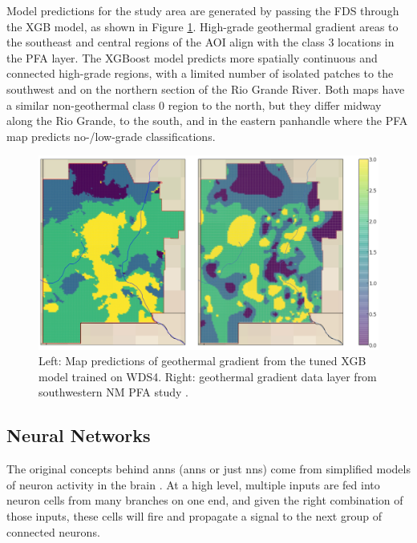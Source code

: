 Model predictions for the study area are generated by passing the FDS through the XGB model, as shown in Figure \ref{fig:xgb_final_map}. High-grade geothermal gradient areas to the southeast and central regions of the AOI align with the class 3 locations in the \citet{bielicki_hydrogeolgic_2015} PFA layer. The XGBoost model predicts more spatially continuous and connected high-grade regions, with a limited number of isolated patches to the southwest and on the northern section of the Rio Grande River. Both maps have a similar non-geothermal class 0 region to the north, but they differ midway along the Rio Grande, to the south, and in the eastern panhandle where the PFA map predicts no-/low-grade classifications.

\begin{figure}[!htp]
\centering
\includegraphics[width=\textwidth]{templates/images/Figure-XGB-FinalMap_Joint.png}
\caption[XGBoost prediction map]{Left: Map predictions of geothermal gradient from the tuned XGB model trained on WDS4. Right: geothermal gradient data layer from southwestern NM PFA study \protect\citep{bielicki_hydrogeolgic_2015}.}
\label{fig:xgb_final_map}
\end{figure}

\subsection{Neural Networks} \label{ch5:ann}
The original concepts behind \acrlong{ann}s (\acrshort{ann}s or just \acrshort{nn}s) come from simplified models of neuron activity in the brain \citep[p.\ 394]{hastie_elements_2009}. At a high level, multiple inputs are fed into neuron cells from many branches on one end, and given the right combination of those inputs, these cells will fire and propagate a signal to the next group of connected neurons.

